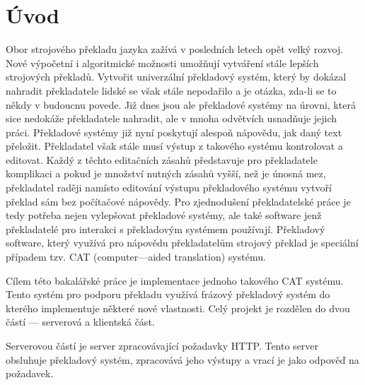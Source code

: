 \documentclass[12pt,a4paper]{report}
\let\openright=\clearpage
\begin{document}
\openright
\pagestyle{plain}
\setcounter{page}{1}
\tableofcontents

%
%
%
%
%

\chapter*{Úvod}

Obor strojového překladu jazyka zažívá v posledních letech opět velký rozvoj. Nové výpočetní i algoritmické možnosti umožňují vytváření stále lepších strojových překladů. Vytvořit univerzální překladový systém, který by dokázal nahradit překladatele lidské se však stále nepodařilo a je otázka, zda-li se to někdy v budoucnu povede. Již dnes jsou ale překladové systémy na úrovni, která sice nedokáže překladatele nahradit, ale v mnoha odvětvích usnadňuje jejich práci. Překladové systémy již nyní poskytují alespoň nápovědu, jak daný text přeložit. Překladatel však stále musí výstup z takového systému kontrolovat a editovat. Každý z těchto editačních zásahů představuje pro překladatele komplikaci a pokud je množství nutných zásahů vyšší, než je únosná mez, překladatel raději namísto editování výstupu překladového systému vytvoří překlad sám bez počítačové nápovědy. Pro zjednodušení překladatelské práce je tedy potřeba nejen vylepšovat překladové systémy, ale také software jenž překladatelé pro interakci s překladovým systémem používají. Překladový software, který využívá pro nápovědu překladatelům strojový překlad je speciální případem tzv. CAT (computer---aided translation) systému.

Cílem této bakalářské práce je implementace jednoho takového CAT systému. Tento systém pro podporu překladu využívá frázový překladový systém do kterého implementuje některé nové vlastnosti. Celý projekt je rozdělen do dvou částí --- serverová a klientská část.

Serverovou částí je server zpracovávající požadavky HTTP. Tento server obsluhuje překladový systém, zpracovává jeho výstupy a vrací je jako odpověď na požadavek.

\end{document}
